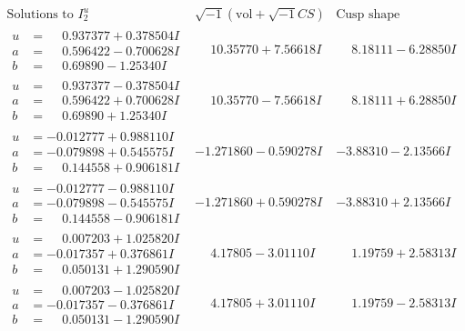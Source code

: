 \documentclass[1p]{elsarticle_modified}
\theoremstyle{definition}
\newcommand{\I}{\sqrt{-1}}
\begin{document}
$$\begin{array}{c|c|c}  
\text{Solutions to }I^u_{2}& \I (\text{vol} + \sqrt{-1}CS) & \text{Cusp shape}\\
 \hline 
\begin{aligned}
u &= \phantom{-}0.937377 + 0.378504 I \\
a &= \phantom{-}0.596422 - 0.700628 I \\
b &= \phantom{-}0.69890 - 1.25340 I\end{aligned}
 & \phantom{-}10.35770 + 7.56618 I & \phantom{-}8.18111 - 6.28850 I \\ \hline\begin{aligned}
u &= \phantom{-}0.937377 - 0.378504 I \\
a &= \phantom{-}0.596422 + 0.700628 I \\
b &= \phantom{-}0.69890 + 1.25340 I\end{aligned}
 & \phantom{-}10.35770 - 7.56618 I & \phantom{-}8.18111 + 6.28850 I \\ \hline\begin{aligned}
u &= -0.012777 + 0.988110 I \\
a &= -0.079898 + 0.545575 I \\
b &= \phantom{-}0.144558 + 0.906181 I\end{aligned}
 & -1.271860 - 0.590278 I & -3.88310 - 2.13566 I \\ \hline\begin{aligned}
u &= -0.012777 - 0.988110 I \\
a &= -0.079898 - 0.545575 I \\
b &= \phantom{-}0.144558 - 0.906181 I\end{aligned}
 & -1.271860 + 0.590278 I & -3.88310 + 2.13566 I \\ \hline\begin{aligned}
u &= \phantom{-}0.007203 + 1.025820 I \\
a &= -0.017357 + 0.376861 I \\
b &= \phantom{-}0.050131 + 1.290590 I\end{aligned}
 & \phantom{-}4.17805 - 3.01110 I & \phantom{-}1.19759 + 2.58313 I \\ \hline\begin{aligned}
u &= \phantom{-}0.007203 - 1.025820 I \\
a &= -0.017357 - 0.376861 I \\
b &= \phantom{-}0.050131 - 1.290590 I\end{aligned}
 & \phantom{-}4.17805 + 3.01110 I & \phantom{-}1.19759 - 2.58313 I \\ \hline\begin{aligned}

\end{aligned}
\end{array}$$
\end{document}
